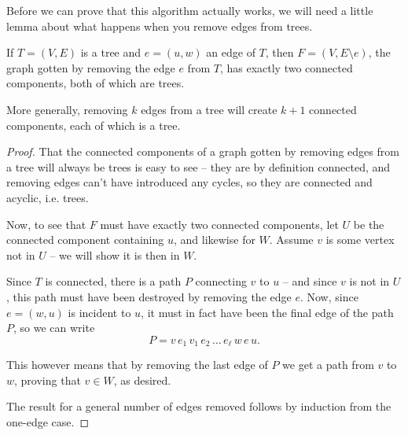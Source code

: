 \documentclass[nobib]{tufte-handout}
\begin{document}
Before we can prove that this algorithm actually works, we will need a little lemma about what happens when you remove edges from trees.

\begin{lemma} \label{lemma:removing_edges_from_trees}
  If $T = (V, E)$ is a tree and $e = (u, w)$ an edge of $T$, then $F = (V, E \setminus e)$, the graph gotten by removing the edge $e$ from $T$, has exactly two connected components, both of which are trees.

  More generally, removing $k$ edges from a tree will create $k+1$ connected components, each of which is a tree.
  
  \begin{proof}
    That the connected components of a graph gotten by removing edges from a tree will always be trees is easy to see -- they are by definition connected, and removing edges can't have introduced any cycles, so they are connected and acyclic, i.e. trees.

    Now, to see that $F$ must have exactly two connected components, let $U$ be the connected component containing $u$, and likewise for $W$. Assume $v$ is some vertex not in $U$ -- we will show it is then in $W$.

    Since $T$ is connected, there is a path $P$ connecting $v$ to $u$ -- and since $v$ is not in $U$, this path must have been destroyed by removing the edge $e$. Now, since $e = (w, u)$ is incident to $u$, it must in fact have been the final edge of the path $P$, so we can write
    $$P = v\, e_1\, v_1\, e_2\, \ldots\, e_\ell\, w\, e\, u.$$
    
    This however means that by removing the last edge of $P$ we get a path from $v$ to $w$, proving that $v \in W$, as desired.

    The result for a general number of edges removed follows by induction from the one-edge case.
  \end{proof}
\end{lemma}
\end{document}
